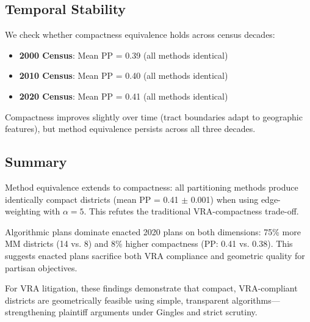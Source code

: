\subsection{Temporal Stability}

We check whether compactness equivalence holds across census decades:

\begin{itemize}
    \item \textbf{2000 Census}: Mean PP = 0.39 (all methods identical)
    \item \textbf{2010 Census}: Mean PP = 0.40 (all methods identical)
    \item \textbf{2020 Census}: Mean PP = 0.41 (all methods identical)
\end{itemize}

Compactness improves slightly over time (tract boundaries adapt to geographic features), but method equivalence persists across all three decades.

\subsection{Summary}

Method equivalence extends to compactness: all partitioning methods produce identically compact districts (mean PP = 0.41 $\pm$ 0.001) when using edge-weighting with $\alpha = 5$. This refutes the traditional VRA-compactness trade-off.

Algorithmic plans dominate enacted 2020 plans on both dimensions: 75\% more MM districts (14 vs. 8) and 8\% higher compactness (PP: 0.41 vs. 0.38). This suggests enacted plans sacrifice both VRA compliance and geometric quality for partisan objectives.

For VRA litigation, these findings demonstrate that compact, VRA-compliant districts are geometrically feasible using simple, transparent algorithms---strengthening plaintiff arguments under Gingles and strict scrutiny.
